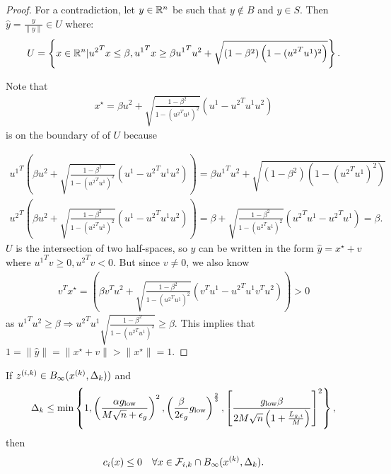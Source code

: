 \begin{proof}
For a contradiction, let $y \in {\mathbb R^{n}}$ be such that $y \not \in B$ and $y \in S$.
Then $\hat y = \frac{y}{\|y\|} \in U$ where:
\begin{align*}
U = \left\{x \in {\mathbb R^{n}} | {u^2}^Tx \le \beta, {u^1}^Tx \ge \beta {u^1}^Tu^2 + \sqrt{(1 - \beta^2)\left(1 - ({u^2}^Tu^1)^2\right)} \right\}.
\end{align*}

Note that
\begin{align*}
x^{\star} = \beta u^2 + \sqrt{\frac{1 - \beta^2}{1 - ({u^2}^Tu^1)^2}} (u^1 - {u^2}^Tu^1 u^2 )
\end{align*}
is on the boundary of of $U$ because

\begin{align*}
{u^1}^T\left(\beta u^2 + \sqrt{\frac{1 - \beta^2}{1 - ({u^2}^Tu^1)^2}} (u^1 - {u^2}^Tu^1 u^2 )\right) = 
\beta {u^1}^Tu^2 + \sqrt{(1 - \beta^2)\left(1 - ({u^2}^Tu^1)^2\right)} \\
{u^2}^T\left(\beta u^2 + \sqrt{\frac{1 - \beta^2}{1 - ({u^2}^Tu^1)^2}} (u^1 - {u^2}^Tu^1 u^2 )\right) = 
\beta + \sqrt{\frac{1 - \beta^2}{1 - ({u^2}^Tu^1)^2}} ({u^2}^Tu^1 - {u^2}^Tu^1 ) = \beta.
\end{align*}
$U$ is the intersection of two half-spaces, so $\hat y$ can be written in the form $\hat y = x^{\star} + v$ where ${u^1}^Tv \ge 0, {u^2}^Tv < 0$.
But since $v \ne 0$, we also know
\begin{align*}
{v}^Tx^{\star} = 
\left(\beta {v}^Tu^2 + \sqrt{\frac{1 - \beta^2}{1 - ({u^2}^Tu^1)^2}} ({v}^Tu^1 - {u^2}^Tu^1 {v}^Tu^2 )\right) > 0
\end{align*}
as ${u^1}^Tu^2 \ge \beta \Longrightarrow {u^2}^Tu^1\sqrt{\frac{1 - \beta^2}{1 - ({u^2}^Tu^1)^2}} \ge \beta$.
This implies that $1 = \|\hat y\| = \|x^{\star} + v\| > \|x^{\star}\| = 1$.
\end{proof}






\begin{theorem}
If $z^{(i, k)} \in B_{\infty}({x^{(k)}}, \Delta_k))$ and
\begin{align*}
\Delta_k \le \min\left\{
1,
\left(\frac{\alpha g_{\text{low}}}{M \sqrt{n} + \epsilon_g}\right)^2,
\left(\frac{\beta}{2\epsilon_{g}}g_{\text{low}}\right)^{\frac 2 3},
\left[\frac {g_{\text{low}} \beta} {2M\sqrt{n}\left(1 + \frac {{L_{g, i}}} M \right)} \right]^2
\right\},\end{align*} then
\begin{align*}
c_i(x) \le 0 \quad \forall x \in {\mathcal F_{i, k}} \cap B_{\infty}({x^{(k)}}, \Delta_k).
\end{align*}

\end{theorem}


